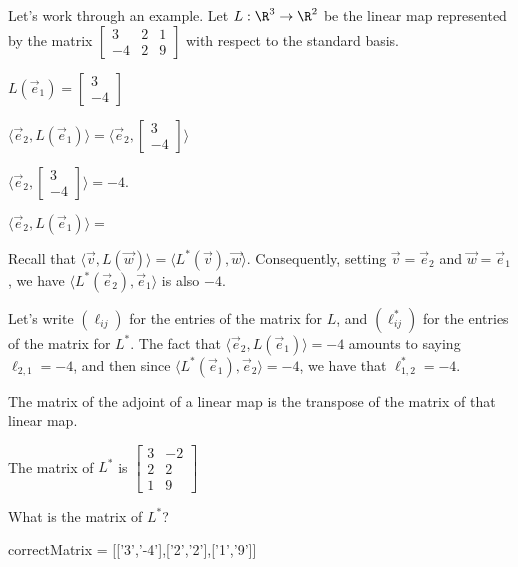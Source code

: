 \documentclass{ximera}
\begin{document}
\begin{question}
  Let's work through an example.  Let $L:\R^3 \to \R^2$ be the linear
  map represented by the matrix \(\begin{bmatrix} 3&2 &1\\
    -4&2&9\end{bmatrix}\) with respect to the standard basis.

  \begin{solution}
    \begin{hint}
      $L(\vec{e}_1) = \begin{bmatrix} 3 \\ -4 \end{bmatrix}$
    \end{hint}
    \begin{hint}
      $\langle \vec{e}_2, L(\vec{e}_1) \rangle = \langle \vec{e}_2, \begin{bmatrix} 3 \\ -4 \end{bmatrix} \rangle$
    \end{hint}
    \begin{hint}
      $\langle \vec{e}_2, \begin{bmatrix} 3 \\ -4 \end{bmatrix} \rangle = -4$.
    \end{hint}

    $\langle \vec{e}_2, L(\vec{e}_1) \rangle = $ 
  \end{solution}

  Recall that $\langle \vec{v}, L(\vec{w})\rangle = \langle  L^*(\vec{v}),\vec{w}\rangle$.  Consequently, setting $\vec{v} = \vec{e}_2$ and $\vec{w} = \vec{e}_1$, we have $\langle L^*(\vec{e}_2), \vec{e}_1 \rangle$ is also $-4$.

  Let's write $(\ell_{ij})$ for the entries of the matrix for $L$, and
  $(\ell^*_{ij})$ for the entries of the matrix for $L^*$.  The fact
  that $\langle \vec{e}_2, L(\vec{e}_1) \rangle = -4$ amounts to
  saying $\ell_{2,1} = -4$, and then since $\langle L^*(\vec{e}_1), \vec{e}_2 \rangle = -4$, we have that $\ell^*_{1,2} = -4$.

  \begin{solution}
    \begin{hint}
      The matrix of the adjoint of a linear map is the transpose of the matrix of that linear map.
    \end{hint}
    \begin{hint}
      The matrix of $L^*$ is \(\begin{bmatrix} 3&-2\\ 2&2\\1&9\end{bmatrix}\)
    \end{hint}
    What is the matrix of $L^*$?
    \begin{matrix-answer}
      correctMatrix = [['3','-4'],['2','2'],['1','9']]
    \end{matrix-answer}
  \end{solution}


\end{question}
\end{document}
